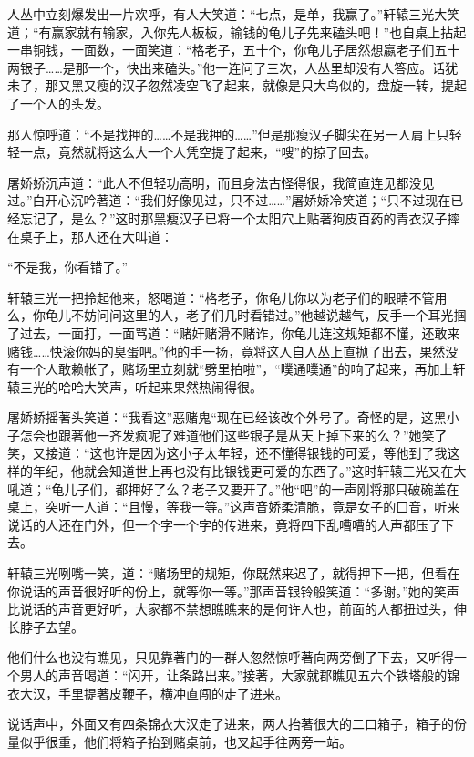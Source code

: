 \documentclass[12pt,oneside]{book}
\begin{document}
人丛中立刻爆发出一片欢呼，有人大笑道：``七点，是单，我赢了。''轩辕三光大笑道；``有赢家就有输家，入你先人板板，输钱的龟儿子先来磕头吧！''也自桌上拈起一串铜钱，一面数，一面笑道：``格老子，五十个，你龟儿子居然想嬴老子们五十两银子\ldots\ldots 是那一个，快出来磕头。''他一连问了三次，人丛里却没有人答应。话犹未了，那又黑又瘦的汉子忽然凌空飞了起来，就像是只大鸟似的，盘旋一转，提起了一个人的头发。

那人惊呼道：``不是找押的\ldots\ldots 不是我押的\ldots\ldots{}''但是那瘦汉子脚尖在另一人肩上只轻轻一点，竟然就将这么大一个人凭空提了起来，``嗖''的掠了回去。

屠娇娇沉声道：``此人不但轻功高明，而且身法古怪得很，我简直连见都没见过。''白开心沉吟著道：``我们好像见过，只不过\ldots\ldots{}''屠娇娇冷笑道；``只不过现在已经忘记了，是么？''这时那黑瘦汉子已将一个太阳穴上贴著狗皮百药的青衣汉子摔在桌子上，那人还在大叫道：

``不是我，你看错了。''

轩辕三光一把拎起他来，怒喝道：``格老子，你龟儿你以为老子们的眼睛不管用么，你龟儿不妨问问这里的人，老子们几时看错过。''他越说越气，反手一个耳光掴了过去，一面打，一面骂道：``赌奸赌滑不赌诈，你龟儿连这规矩都不懂，还敢来赌钱\ldots\ldots 快滚你妈的臭蛋吧。''他的手一扬，竟将这人自人丛上直抛了出去，果然没有一个人敢赖帐了，赌场里立刻就``劈里拍啦''，``噗通噗通''的响了起来，再加上轩辕三光的哈哈大笑声，听起来果然热闹得很。

屠娇娇摇著头笑道：``我看这''恶赌鬼``现在已经该改个外号了。奇怪的是，这黑小子怎会也跟著他一齐发疯呢了难道他们这些银子是从天上掉下来的么？''她笑了笑，又接道：``这也许是因为这小子太年轻，还不懂得银钱的可爱，等他到了我这样的年纪，他就会知道世上再也没有比银钱更可爱的东西了。''这时轩辕三光又在大吼道；``龟儿子们，都押好了么？老子又要开了。''他``吧''的一声刚将那只破碗盖在桌上，突听一人道：``且慢，等我一等。''这声音娇柔清脆，竟是女子的囗音，听来说话的人还在门外，但一个字一个字的传进来，竟将四下乱嘈嘈的人声都压了下去。

轩辕三光咧嘴一笑，道：``赌场里的规矩，你既然来迟了，就得押下一把，但看在你说话的声音很好听的份上，就等你一等。''那声音银铃般笑道：``多谢。''她的笑声比说话的声音更好听，大家都不禁想瞧瞧来的是何许人也，前面的人都扭过头，伸长脖子去望。

他们什么也没有瞧见，只见靠著门的一群人忽然惊呼著向两旁倒了下去，又听得一个男人的声音喝道：``闪开，让条路出来。''接著，大家就郡瞧见五六个铁塔般的锦衣大汉，手里提著皮鞭子，横冲直闯的走了进来。

说话声中，外面又有四条锦衣大汉走了进来，两人抬著很大的二口箱子，箱子的份量似乎很重，他们将箱子抬到赌桌前，也叉起手往两旁一站。
\end{document}
